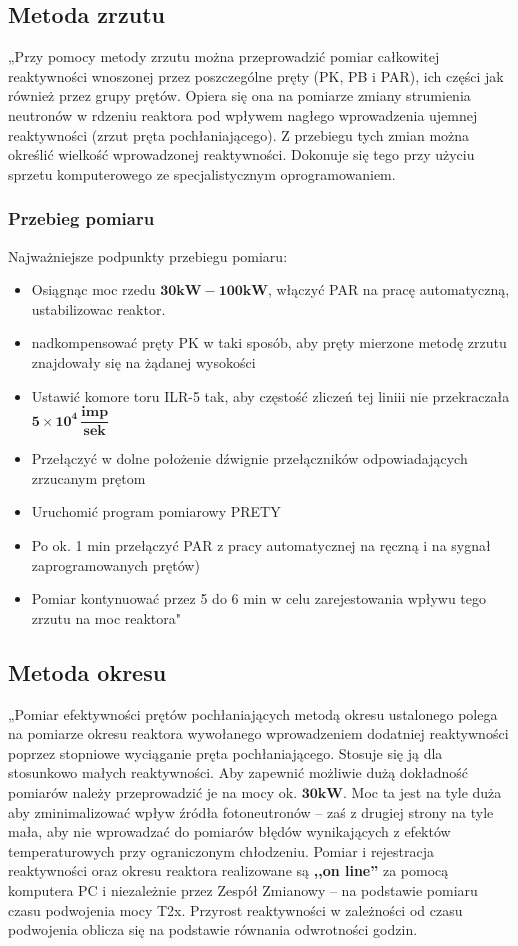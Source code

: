 
\subsection{Metoda zrzutu \cite{OT-12}}\label{metoda_zrzutu}
„Przy pomocy metody zrzutu można przeprowadzić pomiar całkowitej reaktywności wnoszonej przez poszczególne pręty (PK, PB i PAR), ich części jak również przez grupy prętów. Opiera się ona na pomiarze zmiany strumienia neutronów w rdzeniu reaktora pod wpływem nagłego wprowadzenia ujemnej reaktywności (zrzut pręta pochłaniającego). Z przebiegu tych zmian można określić wielkość wprowadzonej reaktywności. Dokonuje się tego przy użyciu sprzetu komputerowego ze specjalistycznym oprogramowaniem. 
\subsubsection{Przebieg pomiaru}
Najważniejsze podpunkty przebiegu pomiaru: 
\begin{itemize}
	

\item Osiągnąc moc rzedu $\mathbf{30kW-100 kW}$, włączyć PAR na pracę automatyczną, ustabilizowac reaktor. 
\item nadkompensować pręty PK w taki sposób, aby pręty mierzone metodę zrzutu znajdowały się na żądanej wysokości 
\item Ustawić komore toru ILR-5 tak, aby częstość zliczeń tej liniii nie przekraczała $\mathbf{5\times10^4\,\dfrac{imp}{sek}}$
\item Przełączyć w dolne położenie dźwignie przełączników odpowiadających zrzucanym prętom
\item Uruchomić program pomiarowy PRETY
\item Po ok. 1 min przełączyć PAR z pracy automatycznej na ręczną i na sygnał zaprogramowanych prętów)
\item Pomiar kontynuować przez 5 do 6 min w celu zarejestowania wpływu tego zrzutu na moc reaktora"\cite{OT-12}
\end{itemize}
\subsection{Metoda okresu\cite{OT-12}}\label{metoda_okresu}
„Pomiar efektywności prętów pochłaniających metodą okresu ustalonego polega na pomiarze okresu reaktora wywołanego wprowadzeniem dodatniej reaktywności poprzez stopniowe wyciąganie pręta pochłaniającego. Stosuje się ją dla stosunkowo małych reaktywności. Aby zapewnić możliwie dużą dokładność pomiarów należy przeprowadzić je na mocy ok. $\mathbf{30kW}$. Moc ta jest na tyle duża aby zminimalizować wpływ źródła fotoneutronów – zaś z drugiej strony na tyle mała, aby nie wprowadzać do pomiarów błędów wynikających z efektów temperaturowych przy ograniczonym chłodzeniu. Pomiar i rejestracja reaktywności oraz okresu reaktora realizowane są \textbf{,,on line''} za pomocą komputera PC i niezależnie przez Zespół Zmianowy – na podstawie pomiaru czasu podwojenia mocy T2x. Przyrost reaktywności w zależności od czasu podwojenia oblicza się na podstawie równania odwrotności godzin.
